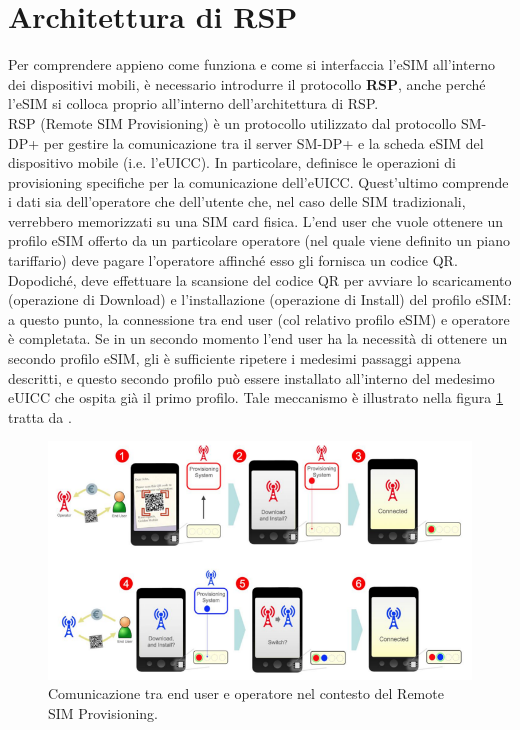 \documentclass[10pt, twoside, openany]{book}
\begin{document}
\section{Architettura di RSP}
Per comprendere appieno come funziona e come si interfaccia l'eSIM all'interno dei dispositivi mobili, è necessario introdurre il protocollo \textbf{RSP}, anche perché l'eSIM si colloca proprio all'interno dell'architettura di RSP.\\
RSP (Remote SIM Provisioning) è un protocollo utilizzato dal protocollo SM-DP+ per gestire la comunicazione tra il server SM-DP+ e la scheda eSIM del dispositivo mobile (i.e. l'eUICC). In particolare, definisce le operazioni di provisioning specifiche per la comunicazione dell'eUICC. Quest'ultimo comprende i dati sia dell'operatore che dell'utente che, nel caso delle SIM tradizionali, verrebbero memorizzati su una SIM card fisica. L'end user che vuole ottenere un profilo eSIM offerto da un particolare operatore (nel quale viene definito un piano tariffario) deve pagare l'operatore affinché esso gli fornisca un codice QR. Dopodiché, deve effettuare la scansione del codice QR per avviare lo scaricamento (operazione di Download) e l'installazione (operazione di Install) del profilo eSIM: a questo punto, la connessione tra end user (col relativo profilo eSIM) e operatore è completata. Se in un secondo momento l'end user ha la necessità di ottenere un secondo profilo eSIM, gli è sufficiente ripetere i medesimi passaggi appena descritti, e questo secondo profilo può essere installato all'interno del medesimo eUICC che ospita già il primo profilo. Tale meccanismo è illustrato nella figura \ref{fig:RSP-functioning} tratta da \cite{GSMA-whitepaper}.
\begin{figure}
\includegraphics[width=\linewidth]{RSP-functioning.png}
\caption{Comunicazione tra end user e operatore nel contesto del Remote SIM Provisioning.}
\label{fig:RSP-functioning}
\end{figure}
\end{document}
